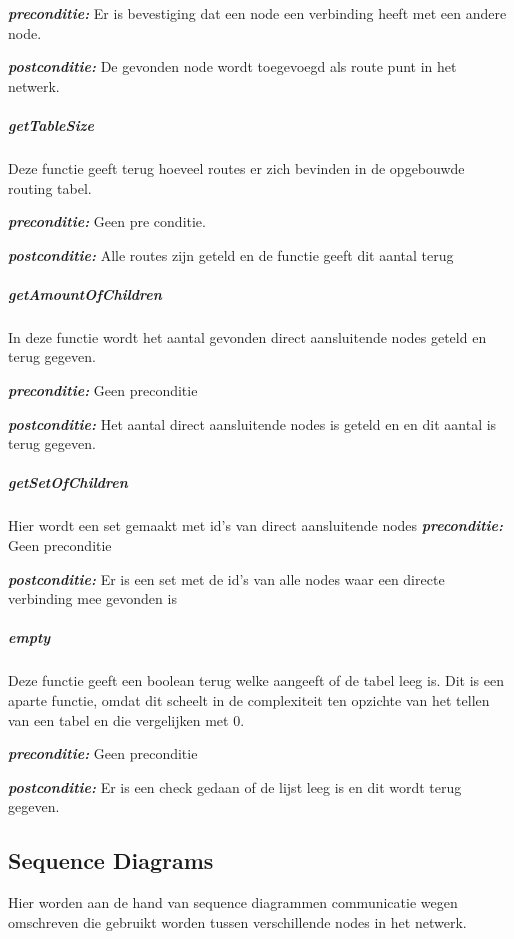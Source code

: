 \documentclass[a4paper, 11pt, oneside]{report}
\begin{document}
\textbf{\textit{preconditie:}}  Er is bevestiging dat een node een verbinding heeft met een andere node.

\textbf{\textit{postconditie:}}  De gevonden node wordt toegevoegd als route punt in het netwerk.


\subparagraph{getTableSize}
Deze functie geeft terug hoeveel routes er zich bevinden in de opgebouwde routing tabel.

\textbf{\textit{preconditie:}} Geen pre conditie.

\textbf{\textit{postconditie:}} Alle routes zijn geteld en de functie geeft dit aantal terug

\subparagraph{getAmountOfChildren}
In deze functie wordt het aantal gevonden direct aansluitende nodes geteld en terug gegeven.  

\textbf{\textit{preconditie:}}  Geen preconditie

\textbf{\textit{postconditie:}} Het aantal direct aansluitende nodes is geteld en en dit aantal is terug gegeven.

\subparagraph{getSetOfChildren}
Hier wordt een set gemaakt met id's van direct aansluitende nodes 
\textbf{\textit{preconditie:}} Geen preconditie

\textbf{\textit{postconditie:}} Er is een set met de id's van alle nodes waar een directe verbinding mee gevonden is

\subparagraph{empty}
Deze functie geeft een boolean terug welke aangeeft of de tabel leeg is.
Dit is een aparte functie, omdat dit scheelt in de complexiteit ten opzichte van het tellen van een tabel en die vergelijken met 0.
  
\textbf{\textit{preconditie:}} Geen preconditie

\textbf{\textit{postconditie:}} Er is een check gedaan of de lijst leeg is en dit wordt terug gegeven.

\subsection{Sequence Diagrams}
\label{DetailedDesign:Communicatie:sequence}
Hier worden aan de hand van sequence diagrammen communicatie wegen omschreven die gebruikt worden tussen verschillende nodes in het netwerk.
\end{document}

